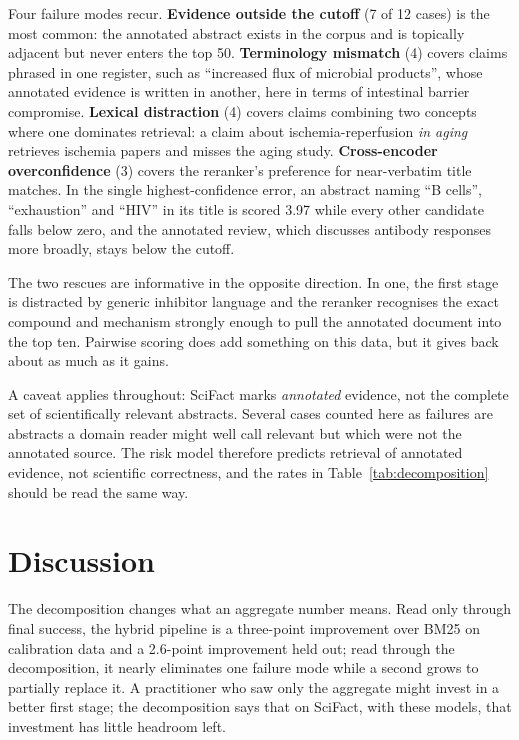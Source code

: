 \documentclass[11pt,a4paper]{article}
\begin{document}
Four failure modes recur. \textbf{Evidence outside the cutoff} (7 of 12 cases) is the most
common: the annotated abstract exists in the corpus and is topically adjacent but never enters
the top 50. \textbf{Terminology mismatch} (4) covers claims phrased in one register, such as
``increased flux of microbial products'', whose annotated evidence is written in another, here
in terms of intestinal barrier compromise. \textbf{Lexical distraction} (4)
covers claims combining two concepts where one dominates retrieval: a claim about
ischemia-reperfusion \emph{in aging} retrieves ischemia papers and misses the aging study.
\textbf{Cross-encoder overconfidence} (3) covers the reranker's preference for near-verbatim
title matches. In the single highest-confidence error, an abstract naming ``B cells'',
``exhaustion'' and ``HIV'' in its title is scored 3.97 while every other candidate falls below
zero, and the annotated review, which discusses antibody responses more broadly, stays below the
cutoff.

The two rescues are informative in the opposite direction. In one, the first stage is distracted
by generic inhibitor language and the reranker recognises the exact compound and mechanism
strongly enough to pull the annotated document into the top ten. Pairwise scoring does add
something on this data, but it gives back about as much as it gains.

A caveat applies throughout: SciFact marks \emph{annotated} evidence, not the complete set of
scientifically relevant abstracts. Several cases counted here as failures are abstracts a domain
reader might well call relevant but which were not the annotated source. The risk model therefore
predicts retrieval of annotated evidence, not scientific correctness, and the rates in
Table~\ref{tab:decomposition} should be read the same way.

\section{Discussion}

The decomposition changes what an aggregate number means. Read only through final success, the
hybrid pipeline is a three-point improvement over BM25 on calibration data and a 2.6-point
improvement held out; read through the decomposition, it nearly eliminates one failure mode
while a second grows to partially replace it. A practitioner who saw only the aggregate might
invest in a better first stage; the decomposition says that on SciFact, with these models, that
investment has little headroom left.
\end{document}
